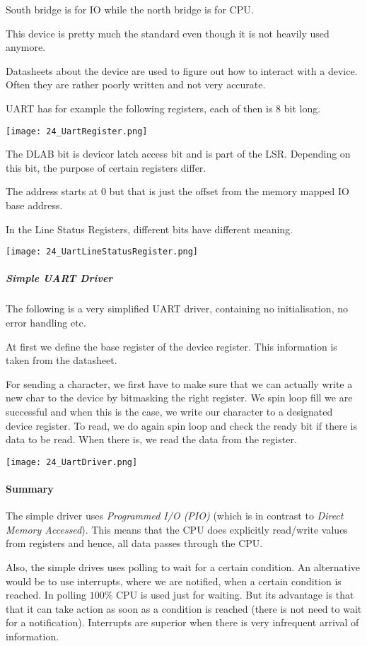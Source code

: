 South bridge is for IO while the north bridge is for CPU.

This device is pretty much the standard even though it is not heavily used anymore.

Datasheets about the device are used to figure out how to interact with a device. Often they are rather poorly written and not very accurate.

UART has for example the following registers, each of then is $8$ bit long.

\texttt{[image: 24\_UartRegister.png]}

The DLAB bit is devicor latch access bit and is part of the LSR. Depending on this bit, the purpose of certain registers differ.

The address starts at $0$ but that is just the offset from the memory mapped IO base address.

In the Line Status Registers, different bits have different meaning.

\texttt{[image: 24\_UartLineStatusRegister.png]}

\subparagraph{Simple UART Driver}
The following is a very simplified UART driver, containing no initialisation, no error handling etc.

At first we define the base register of the device register. This information is taken from the datasheet.

For sending a character, we first have to make sure that we can actually write a new char to the device by bitmasking the right register. We spin loop fill we are successful and when this is the case, we write our character to a designated device register. To read, we do again spin loop and check the ready bit if there is data to be read. When there is, we read the data from the register.

\texttt{[image: 24\_UartDriver.png]}

\paragraph{Summary}
The simple driver uses \textit{Programmed I/O (PIO)} (which is in contrast to \textit{Direct Memory Accessed}). This means that the CPU does explicitly read/write values from registers and hence, all data passes through the CPU.

Also, the simple drives uses polling to wait for a certain condition. An alternative would be to use interrupts, where we are notified, when a certain condition is reached. In polling $100\%$ CPU is used just for waiting. But its advantage is that that it can take action as soon as a condition is reached (there is not need to wait for a notification). Interrupts are superior when there is very infrequent arrival of information.

